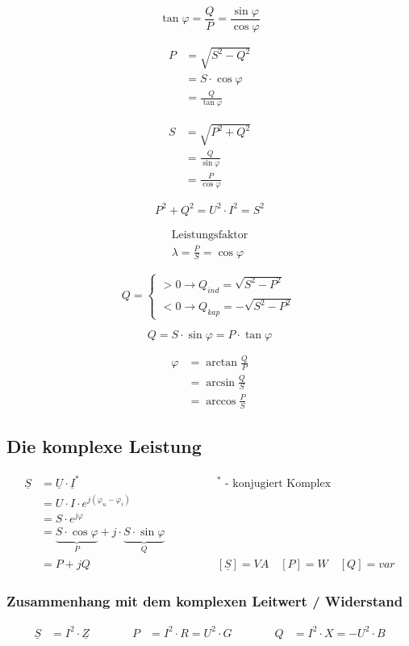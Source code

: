 \begin{multicols}{2}
\[\tan\varphi=\frac{Q}{P}=\frac{\sin\varphi}{\cos\varphi}\]

\begin{align*}
P&=\sqrt{S^2-Q^2} \\
 &=S\cdot\cos\varphi \\
 &=\frac{Q}{\tan\varphi}
\end{align*}

\begin{align*}
S&=\sqrt{P^2+Q^2} \\
 &=\frac{Q}{\sin\varphi} \\
 &=\frac{P}{\cos\varphi}
\end{align*}

\[P^2+Q^2=U^2\cdot I^2=S^2\]

\begin{align*}
\text{Leistungsfaktor} \\
\lambda = \frac{P}{S} = \cos\varphi
\end{align*}

\[Q =
\begin{cases}
>0 \rightarrow Q_{ind} = \sqrt{S^2-P^2} \\
<0 \rightarrow Q_{kap} = -\sqrt{S^2-P^2}
\end{cases}\]

\[Q=S\cdot\sin\varphi=P\cdot\tan\varphi\]

\begin{align*}
\varphi&=\arctan\frac{Q}{P} \\ 
       &=\arcsin\frac{Q}{S} \\
       &=\arccos\frac{P}{S}
\end{align*}

\end{multicols}

\subsection*{Die komplexe Leistung}
\begin{alignat*}{2}
\underline{S}&=\underline{U}\cdot\underline{I}^* &\quad\quad\quad& ^*\text{ - konjugiert Komplex} \\
	     &=U \cdot I \cdot e^{j\left(\varphi_u - \varphi_i\right)} \\
	     &=S \cdot e^{j\varphi} \\
	     &=\underbrace{S \cdot \cos\varphi}_P + j \cdot \underbrace{S \cdot \sin\varphi}_Q \\
	     &=P + j Q &\quad\quad& \left[\underline{S}\right] = VA \quad \left[P\right] = W \quad \left[Q\right] = var
\end{alignat*}

\subsubsection*{Zusammenhang mit dem komplexen Leitwert / Widerstand}
\begin{alignat*}{3}
\underline{S} &= I^2 \cdot \underline{Z} &\quad\quad\quad  P &= I^2 \cdot R = U^2 \cdot G &\quad\quad\quad Q &= I^2 \cdot X = -U^2 \cdot B
\end{alignat*}